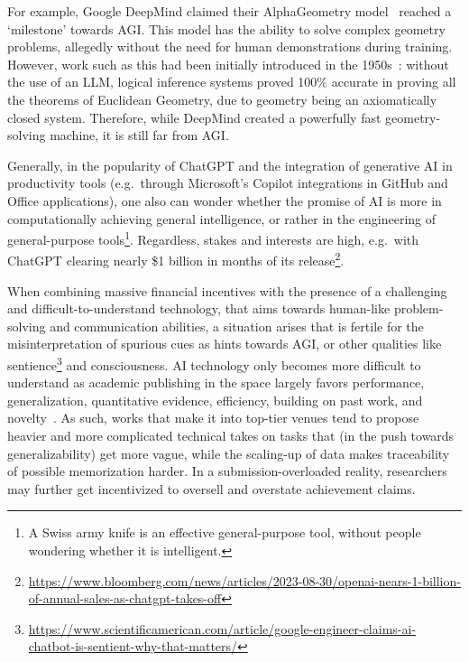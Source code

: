 For example, Google DeepMind claimed their AlphaGeometry model~\citep{trinh2024geometry} reached a `milestone' towards AGI. This model has the ability to solve complex geometry problems, allegedly without the need for human demonstrations during training. However, work such as this had been initially introduced in the 1950s~\citep{hector2024linkedin}: without the use of an LLM, logical inference systems proved 100\% accurate in proving all the theorems of Euclidean Geometry, due to geometry being an axiomatically closed system. Therefore, while DeepMind created a powerfully fast geometry-solving machine, it is still far from AGI.

Generally, in the popularity of ChatGPT and the integration of generative AI in productivity tools (e.g.\ through Microsoft's Copilot integrations in GitHub and Office applications), one also can wonder whether the promise of AI is more in computationally achieving general intelligence, or rather in the engineering of general-purpose tools\footnote{A Swiss army knife is an effective general-purpose tool, without people wondering whether it is intelligent.}. Regardless, stakes and interests are high, e.g.\ with ChatGPT clearing nearly \$1 billion in months of its release\footnote{\url{https://www.bloomberg.com/news/articles/2023-08-30/openai-nears-1-billion-of-annual-sales-as-chatgpt-takes-off}}.

When combining massive financial incentives with the presence of a challenging and difficult-to-understand technology, that aims towards human-like problem-solving and communication abilities, a situation arises that is fertile for the misinterpretation of spurious cues as hints towards AGI, or other qualities like sentience\footnote{\url{https://www.scientificamerican.com/article/google-engineer-claims-ai-chatbot-is-sentient-why-that-matters/}} and consciousness. AI technology only becomes more difficult to understand as academic publishing in the space largely favors performance, generalization, quantitative evidence, efficiency, building on past work, and novelty~\citep{values_in_ML,rudin2019stop}. As such, works that make it into top-tier venues tend to propose heavier and more complicated technical takes on tasks that (in the push towards generalizability) get more vague, while the scaling-up of data makes traceability of possible memorization harder. In a submission-overloaded reality, researchers may further get incentivized to oversell and overstate achievement claims.

